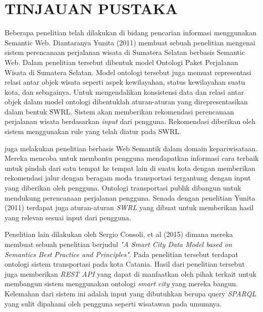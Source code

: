 
\chapter{TINJAUAN PUSTAKA}                

Beberapa penelitian telah dilakukan di bidang pencarian informasi menggunakan Semantic Web. Diantaranya Yunita (2011) membuat sebuah penelitian mengenai sistem perencanaan perjalanan wisata di Sumatera Selatan berbasis Semantic Web. Dalam penelitian tersebut dibentuk model Ontologi Paket Perjalanan Wisata di Sumatera Selatan. Model ontologi tersebut juga memuat representasi relasi antar objek wisata seperti aspek kewilayahan, status kewilayahan suatu kota, dan sebagainya. Untuk mengendalikan konsistensi data dan relasi antar objek dalam model ontologi dibentuklah aturan-aturan yang direpresentasikan dalam bentuk SWRL. Sistem akan memberikan rekomendasi perencanaan perjalanan wisata berdasarkan \emph{input} dari pengguna. Rekomendasi diberikan oleh sistem menggunakan rule yang telah diatur pada SWRL.

\cite{5507372} juga melakukan penelitian berbasis Web Semantik dalam domain kepariwisataan. Mereka mencoba untuk membantu pengguna mendapatkan informasi cara terbaik untuk pindah dari satu tempat ke tempat lain di suatu kota dengan memberikan rekomendasi jalur dengan beragam moda transportasi tergantung dengan input yang diberikan oleh pengguna. Ontologi transportasi publik dibangun untuk mendukung perencanaan perjalanan pengguna. Senada dengan penelitian Yunita (2011) terdapat juga aturan-aturan \emph{SWRL} yang dibuat untuk memberikan hasil yang relevan sesuai input dari pengguna.

Penelitian lain dilakukan oleh Sergio Consoli, et al (2015) dimana mereka membuat sebuah penelitian berjudul \emph{"A Smart City Data Model based on Semantics Best Practice and Principles"}. Pada penelitian tersebut terdapat ontologi sistem transportasi pada kota Catania. Hasil dari penelitian tersebut juga memberikan \emph{REST API} yang dapat di manfaatkan oleh pihak terkait untuk membangun sistem menggunakan ontologi \emph{smart city} yang mereka bangun. Kelemahan dari sistem ini adalah input yang dibutuhkan berupa query \emph{SPARQL} yang sulit dipahami oleh pengguna seperti wisatawan pada umumnya.

